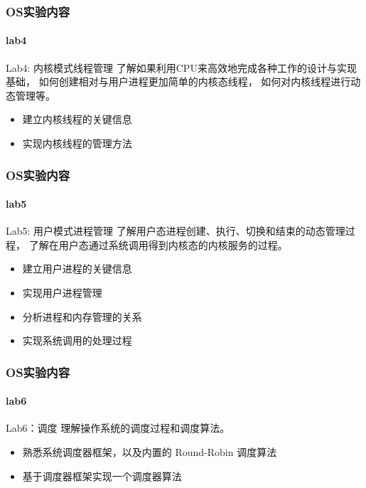 \begin{frame}
\frametitle{OS实验内容}
\framesubtitle{lab4}

\begin{block}{Lab4: 内核模式线程管理}
了解如果利用CPU来高效地完成各种工作的设计与实现基础，
如何创建相对与用户进程更加简单的内核态线程，
如何对内核线程进行动态管理等。
\end{block}

\begin{itemize}
    \item 建立内核线程的关键信息
    \item 实现内核线程的管理方法
\end{itemize}

\end{frame}


\begin{frame}
\frametitle{OS实验内容}
\framesubtitle{lab5}

\begin{block}{Lab5: 用户模式进程管理}
了解用户态进程创建、执行、切换和结束的动态管理过程，
了解在用户态通过系统调用得到内核态的内核服务的过程。
\end{block}

\begin{itemize}
    \item 建立用户进程的关键信息
    \item 实现用户进程管理
    \item 分析进程和内存管理的关系
    \item 实现系统调用的处理过程
\end{itemize}

\end{frame}

\begin{frame}
\frametitle{OS实验内容}
\framesubtitle{lab6}

\begin{block}{Lab6：调度}
理解操作系统的调度过程和调度算法。
\end{block}

\begin{itemize}
    \item 熟悉系统调度器框架，以及内置的 Round-Robin 调度算法
    \item 基于调度器框架实现一个调度器算法
\end{itemize}

\end{frame}



